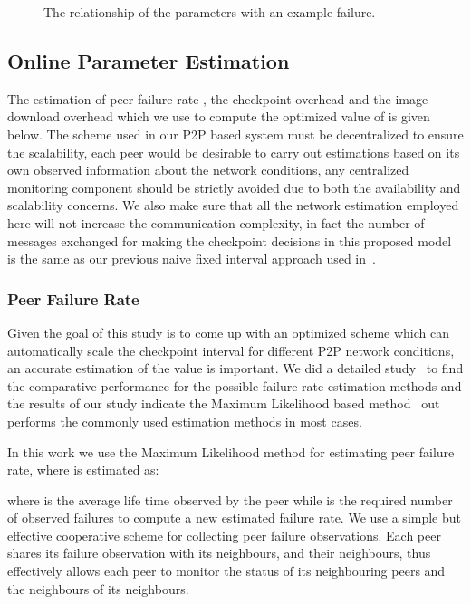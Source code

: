 \documentclass[times, 12pt, onecolumn]{article}
\begin{document}
\begin{figure}
\caption{The relationship of the parameters with an example failure.}
\label{timeline}
\end{figure}

 

\subsection{Online Parameter Estimation}
\label{estimation}
The estimation of peer failure rate , the checkpoint overhead  and the image download overhead 
 which we use to compute the optimized value of  is given below. The scheme used in our 
P2P based system must be decentralized to ensure the scalability, each peer would be desirable to carry 
out estimations based on its own observed information about the network conditions, any centralized 
monitoring component should be strictly avoided due to both the availability and scalability concerns. 
We also make sure that all the network estimation employed here will not increase the communication 
complexity, in fact the number of messages exchanged for making the checkpoint decisions in this proposed 
model is the same as our previous naive fixed interval approach used in~\cite{dvm,mpichopen}.

\subsubsection{Peer Failure Rate }
\label{failureestimation}
Given the goal of this study is to come up with an optimized scheme which can automatically scale the
checkpoint interval for different P2P network conditions, an accurate estimation of the value  
is important. We did a detailed study~\cite{estimation} to find the comparative performance for the possible failure rate 
estimation methods and the results of our study indicate the Maximum Likelihood based method~\cite{estimation} out performs 
the commonly used estimation methods in most cases. 

In this work we use the Maximum Likelihood method for estimating peer failure rate, where 
 is estimated as: 

where  is the average life time observed by the peer while  is the required number of 
observed failures to compute a new estimated failure rate. We use a simple but effective cooperative scheme 
for collecting peer failure observations. Each peer shares its failure observation with its neighbours, and
their neighbours, thus effectively allows each peer to monitor the status of its neighbouring peers and the 
neighbours of its neighbours.    
\end{document}
